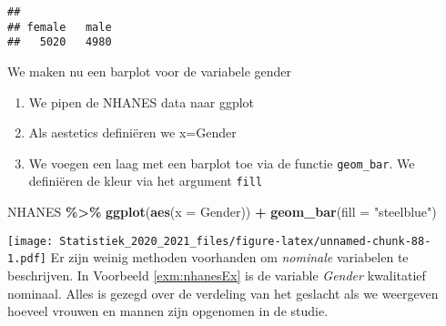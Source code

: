 \documentclass[
  12pt,dutch,coursenotes]{book}
\newenvironment{Shaded}{\begin{snugshade}}{\end{snugshade}}
\newcommand{\CommentTok}[1]{\textcolor[rgb]{0.56,0.35,0.01}{\textit{#1}}}
\newcommand{\DataTypeTok}[1]{\textcolor[rgb]{0.13,0.29,0.53}{#1}}
\newcommand{\KeywordTok}[1]{\textcolor[rgb]{0.13,0.29,0.53}{\textbf{#1}}}
\newcommand{\NormalTok}[1]{#1}
\newcommand{\OperatorTok}[1]{\textcolor[rgb]{0.81,0.36,0.00}{\textbf{#1}}}
\newcommand{\StringTok}[1]{\textcolor[rgb]{0.31,0.60,0.02}{#1}}
\providecommand{\tightlist}{%
  \setlength{\itemsep}{0pt}\setlength{\parskip}{0pt}}
\theoremstyle{definition}
\theoremstyle{definition}
\theoremstyle{definition}
\theoremstyle{remark}
\begin{document}
\begin{Shaded}
\end{Shaded}

\begin{verbatim}
## 
## female   male 
##   5020   4980
\end{verbatim}

We maken nu een barplot voor de variabele gender

\begin{enumerate}
\def\labelenumi{\arabic{enumi}.}
\tightlist
\item
  We pipen de NHANES data naar ggplot
\item
  Als aestetics definiëren we x=Gender
\item
  We voegen een laag met een barplot toe via de functie \texttt{geom\_bar}. We definiëren de kleur via het argument \texttt{fill}
\end{enumerate}

\begin{Shaded}
\begin{Highlighting}[]
\NormalTok{NHANES }\OperatorTok{\%\textgreater{}\%}\StringTok{ }\KeywordTok{ggplot}\NormalTok{(}\KeywordTok{aes}\NormalTok{(}\DataTypeTok{x =}\NormalTok{ Gender)) }\OperatorTok{+}\StringTok{ }\KeywordTok{geom\_bar}\NormalTok{(}\DataTypeTok{fill =} \StringTok{"steelblue"}\NormalTok{)}
\end{Highlighting}
\end{Shaded}

\texttt{[image: Statistiek\_2020\_2021\_files/figure-latex/unnamed-chunk-88-1.pdf]}
Er zijn weinig methoden voorhanden om \emph{nominale} variabelen te
beschrijven. In Voorbeeld \ref{exm:nhanesEx} is de variable \emph{Gender}
kwalitatief nominaal.
Alles is gezegd over de verdeling van het geslacht als we weergeven hoeveel vrouwen en mannen zijn opgenomen in de studie.
\end{document}
